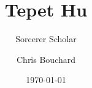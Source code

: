 ﻿\documentclass[10pt,twocolumn,twoside]{book}
\title{Tepet Hu}
\subtitle{Sorcerer Scholar}
\author{Chris Bouchard}
\date{\ddmmmyyyydate\today}
\begin{document}
\frontmatter
{}
\pagestyle{empty}

\begin{titlepage}
    \MakeExaltedTitle
\end{titlepage}

\cleardoublepage



\mainmatter
\pagestyle{main}





\end{document}

